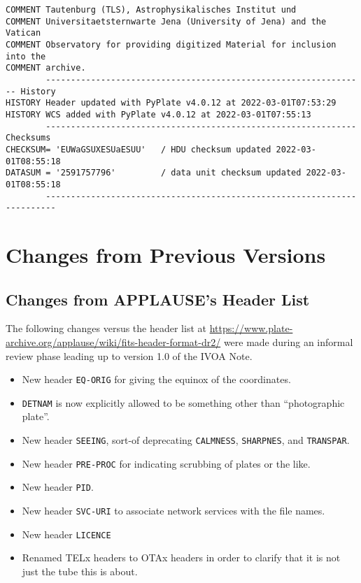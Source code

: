 \documentclass[11pt]{ivoa}
\newcommand\cardname[1]{\texttt{\color{keyword}#1}}
\begin{document}
\begin{lstlisting}
COMMENT Tautenburg (TLS), Astrophysikalisches Institut und
COMMENT Universitaetsternwarte Jena (University of Jena) and the Vatican
COMMENT Observatory for providing digitized Material for inclusion into the
COMMENT archive.
        ---------------------------------------------------------------- History
HISTORY Header updated with PyPlate v4.0.12 at 2022-03-01T07:53:29
HISTORY WCS added with PyPlate v4.0.12 at 2022-03-01T07:55:13
        -------------------------------------------------------------- Checksums
CHECKSUM= 'EUWaGSUXESUaESUU'   / HDU checksum updated 2022-03-01T08:55:18
DATASUM = '2591757796'         / data unit checksum updated 2022-03-01T08:55:18
        ------------------------------------------------------------------------
\end{lstlisting}


\appendix
\section{Changes from Previous Versions}

\subsection{Changes from APPLAUSE's Header List}

The following changes versus the header list at 
\url{https://www.plate-archive.org/applause/wiki/fits-header-format-dr2/}
were made during an informal review phase leading
up to version 1.0 of the IVOA Note.

\begin{itemize}
\item New header \cardname{EQ-ORIG} for giving the equinox of the
coordinates.
\item \cardname{DETNAM} is now explicitly allowed to be something other
than ``photographic plate''.
\item New header \cardname{SEEING}, sort-of deprecating
\cardname{CALMNESS}, \cardname{SHARPNES}, and \cardname{TRANSPAR}.
\item New header \cardname{PRE-PROC} for indicating scrubbing of plates
or the like.
\item New header \cardname{PID}.
\item New header \cardname{SVC-URI} to associate network services with
the file names.
\item New header \cardname{LICENCE}
\item Renamed TELx headers to OTAx headers in order to clarify that it
is not just the tube this is about.
\end{itemize}


\end{document}
